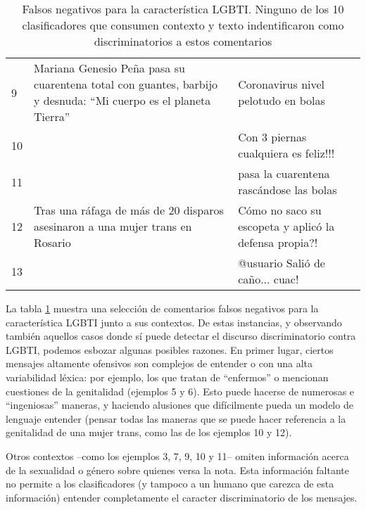 \begin{table}[t]
\begin{tabular}{p{} p{} p{}}
        \hline
        9 & Mariana Genesio Peña pasa su cuarentena total con guantes, barbijo y desnuda: ``Mi cuerpo es el planeta Tierra'' & Coronavirus nivel pelotudo en bolas	\\
        10 &    & Con 3 piernas cualquiera es feliz!!!	\\
        11 &    & pasa la cuarentena rascándose las bolas \\
        \hline
        12 & Tras una ráfaga de más de 20 disparos asesinaron a una mujer trans en Rosario & Cómo no saco su escopeta y aplicó la defensa propia?! \\
        13 & & @usuario Salió de caño... cuac!	\\
        \hline
    \end{tabular}
    \caption{Falsos negativos para la característica LGBTI. Ninguno de los 10 clasificadores que consumen contexto y texto indentificaron como discriminatorios a estos comentarios }
    \label{tab:lgbti_error_analysis}
\end{table}

La tabla \ref{tab:lgbti_error_analysis} muestra una selección de comentarios falsos negativos para la característica LGBTI junto a sus contextos. De estas instancias, y observando también aquellos casos donde sí puede detectar el discurso discriminatorio contra LGBTI, podemos esbozar algunas posibles razones. En primer lugar, ciertos mensajes altamente ofensivos son complejos de entender o con una alta variabilidad léxica: por ejemplo, los que tratan de ``enfermos'' o mencionan cuestiones de la genitalidad (ejemplos 5 y 6). Esto puede hacerse de numerosas e ``ingeniosas'' maneras, y haciendo alusiones que difícilmente pueda un modelo de lenguaje entender (pensar todas las maneras que se puede hacer referencia a la genitalidad de una mujer trans, como las de los ejemplos 10 y 12).

Otros contextos --como los ejemplos 3, 7, 9, 10 y 11-- omiten información acerca de la sexualidad o género sobre quienes versa la nota. Esta información faltante no permite a los clasificadores (y tampoco a un humano que carezca de esta información) entender completamente el caracter discriminatorio de los mensajes.


